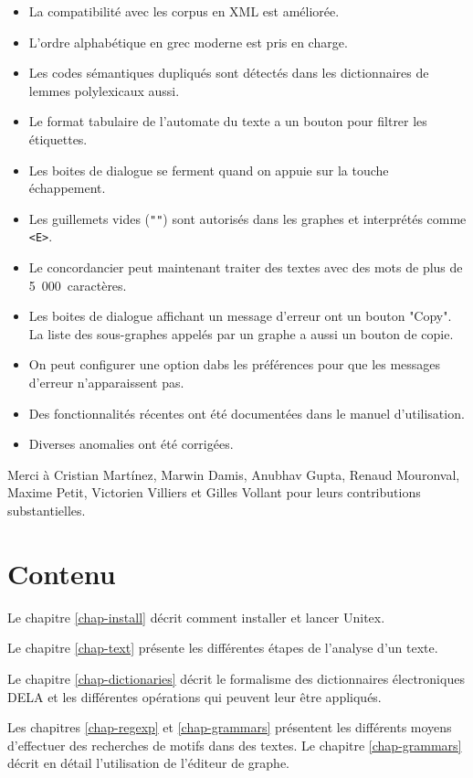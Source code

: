\begin{itemize}
  \item La compatibilité avec les corpus en XML est améliorée.
  \item L'ordre alphabétique en grec moderne est pris en charge.
  \item Les codes sémantiques dupliqués sont détectés dans les dictionnaires de lemmes polylexicaux
  aussi.
  \item Le format tabulaire de l'automate du texte a un bouton pour filtrer les étiquettes.
  \item Les boites de dialogue se ferment quand on appuie sur la touche échappement.
  \item Les guillemets vides (\verb$""$) sont autorisés dans les graphes et interprétés comme
  \verb$<E>$.
  \item Le concordancier peut maintenant traiter des textes avec des mots de plus de
  5~000~caractères.
  \item Les boites de dialogue affichant un message d'erreur ont un bouton "Copy". La liste des
  sous-graphes appelés par un graphe a aussi un bouton de copie.
  \item On peut configurer une option dabs les préférences pour que les messages d'erreur
  n'apparaissent pas.
  \item Des fonctionnalités récentes ont été documentées dans le manuel d'utilisation.
  \item Diverses anomalies ont été corrigées. 
\end{itemize}

\noindent Merci à Cristian Martínez, Marwin Damis, Anubhav Gupta, Renaud Mouronval,
Maxime Petit, Victorien Villiers et Gilles Vollant pour leurs contributions substantielles.


\section*{Contenu}
\noindent Le chapitre \ref{chap-install} décrit comment installer et lancer Unitex.

\bigskip \noindent Le chapitre \ref{chap-text} présente les différentes étapes de l'analyse d'un
texte.

\bigskip \noindent Le chapitre \ref{chap-dictionaries} décrit le formalisme 
des dictionnaires électroniques DELA et les différentes opérations qui peuvent leur être appliqués.

\bigskip \noindent Les chapitres \ref{chap-regexp} et \ref{chap-grammars}
présentent les différents moyens d’effectuer des recherches de motifs dans des textes.
Le chapitre \ref{chap-grammars} décrit en détail l'utilisation de l'éditeur de graphe.

